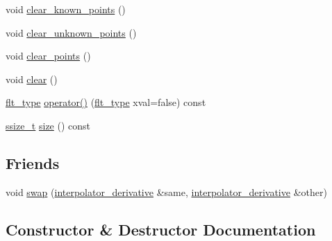 \begin{DoxyCompactItemize}
\item 
void \hyperlink{classIceBRG_1_1interpolator__derivative_a152a94328c90713d3ede015779241b8b}{clear\+\_\+known\+\_\+points} ()
\item 
void \hyperlink{classIceBRG_1_1interpolator__derivative_abde12b268e7ec924a29558b90056810c}{clear\+\_\+unknown\+\_\+points} ()
\item 
void \hyperlink{classIceBRG_1_1interpolator__derivative_a3b4deafebb35ac9e3b591b2eff32ffa3}{clear\+\_\+points} ()
\item 
void \hyperlink{classIceBRG_1_1interpolator__derivative_a18cc5776fa8d1142687d53f8d07c16a2}{clear} ()
\item 
\hyperlink{lib_2IceBRG__main_2common_8h_ad0f130a56eeb944d9ef2692ee881ecc4}{flt\+\_\+type} \hyperlink{classIceBRG_1_1interpolator__derivative_af10d5307357c8d3e4164885a66962a79}{operator()} (\hyperlink{lib_2IceBRG__main_2common_8h_ad0f130a56eeb944d9ef2692ee881ecc4}{flt\+\_\+type} xval=false) const 
\item 
\hyperlink{lib_2IceBRG__main_2common_8h_ab322a3e50421dc5f0c43316b1b373592}{ssize\+\_\+t} \hyperlink{classIceBRG_1_1interpolator__derivative_ae25cb02754b3597a53b8346f1dc36599}{size} () const 
\end{DoxyCompactItemize}
\subsection*{Friends}
\begin{DoxyCompactItemize}
\item 
void \hyperlink{classIceBRG_1_1interpolator__derivative_ab428fdd5da9a3c82daaa46de8204f389}{swap} (\hyperlink{classIceBRG_1_1interpolator__derivative}{interpolator\+\_\+derivative} \&same, \hyperlink{classIceBRG_1_1interpolator__derivative}{interpolator\+\_\+derivative} \&other)
\end{DoxyCompactItemize}


\subsection{Constructor \& Destructor Documentation}
\hypertarget{classIceBRG_1_1interpolator__derivative_abd5850c4412171559d4aa969496518f0}{}
